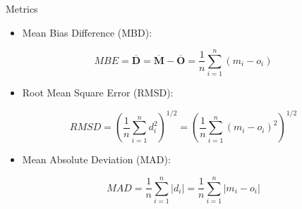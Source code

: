 \documentclass[xcolor={usenames,svgnames,dvipsnames}]{beamer}
\begin{document}
\begin{frame}[label={sec:orga3f804c}]{Metrics}
\begin{itemize}
\item Mean Bias Difference (MBD):
\end{itemize}
\[
MBE = \overline{\mathbf{D}} = \overline{\mathbf{M}} - \overline{\mathbf{O}} = \frac{1}{n} \sum_{i=1}^n (m_i - o_i)
\]

\begin{itemize}
\item Root Mean Square Error (RMSD):
\end{itemize}
\[
RMSD = \left(\frac{1}{n} \sum_{i=1}^n d_i^2 \right)^{1/2} =  \left( \frac{1}{n} \sum_{i=1}^n (m_i - o_i)^2  \right)^{1/2}
\]

\begin{itemize}
\item Mean Absolute Deviation (MAD):
\end{itemize}

\[
MAD = \frac{1}{n} \sum_{i=1}^n \left|d_i\right| =  \frac{1}{n} \sum_{i=1}^n \left|m_i - o_i\right|
\]
\end{frame}
\end{document}
